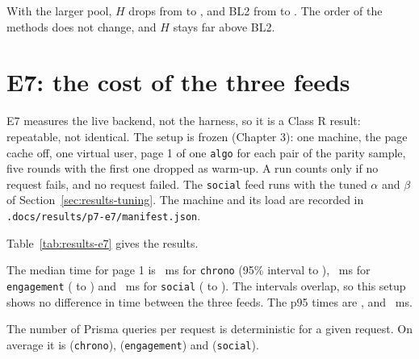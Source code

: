 With the larger pool, $H$ drops from \eOneWTwoMNdcgHTenAllValue{} to \eEightWTwoMNdcgHTenAllValue{}, and BL2 from \eOneWTwoMNdcgBLTwoTenAllValue{} to \eEightWTwoMNdcgBLTwoTenAllValue{}. The order of the methods does not change, and $H$ stays far above BL2.

\section{E7: the cost of the three feeds}
\label{sec:results-e7}

E7 measures the live backend, not the harness, so it is a Class R result: repeatable, not identical. The setup is frozen (Chapter 3): one machine, the page cache off, one virtual user, page 1 of one \texttt{algo} for each pair of the parity sample, five rounds with the first one dropped as warm-up. A run counts only if no request fails, and no request failed. The \texttt{social} feed runs with the tuned $\alpha$ and $\beta$ of Section~\ref{sec:results-tuning}. The machine and its load are recorded in \texttt{.docs/results/p7-e7/manifest.json}.

Table~\ref{tab:results-e7} gives the results.

\begin{table}[htbp]
  \centering
  \caption{E7: the cost of the three feeds, page 1 on one machine with the page cache off: median of the kept runs with its 95\% bootstrap interval, p95, and Prisma queries per request.}
  \label{tab:results-e7}
  \small
  \resizebox{\textwidth}{!}{}
\end{table}

The median time for page 1 is \eSevenChronoMedian{}~ms for \texttt{chrono} (95\% interval \eSevenChronoCiLow{} to \eSevenChronoCiHigh{}), \eSevenEngagementMedian{}~ms for \texttt{engagement} (\eSevenEngagementCiLow{} to \eSevenEngagementCiHigh{}) and \eSevenSocialMedian{}~ms for \texttt{social} (\eSevenSocialCiLow{} to \eSevenSocialCiHigh{}). The intervals overlap, so this setup shows no difference in time between the three feeds. The p95 times are \eSevenChronoPNinetyFive{}, \eSevenEngagementPNinetyFive{} and \eSevenSocialPNinetyFive{}~ms.

The number of Prisma queries per request is deterministic for a given request. On average it is \eSevenChronoQueriesMean{} (\texttt{chrono}), \eSevenEngagementQueriesMean{} (\texttt{engagement}) and \eSevenSocialQueriesMean{} (\texttt{social}).

